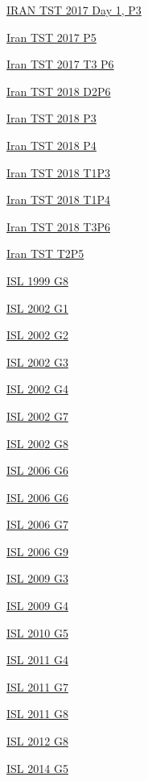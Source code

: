 \hyperref  [problem:IRAN TST 2017 Day 1, P3]{IRAN TST 2017 Day 1, P3}

\hyperref  [problem:Iran TST 2017 P5]{Iran TST 2017 P5}

\hyperref  [problem:Iran TST 2017 T3 P6]{Iran TST 2017 T3 P6}

\hyperref  [problem:Iran TST 2018 D2P6]{Iran TST 2018 D2P6}

\hyperref  [problem:Iran TST 2018 P3]{Iran TST 2018 P3}

\hyperref  [problem:Iran TST 2018 P4]{Iran TST 2018 P4}

\hyperref  [problem:Iran TST 2018 T1P3]{Iran TST 2018 T1P3}

\hyperref  [problem:Iran TST 2018 T1P4]{Iran TST 2018 T1P4}

\hyperref  [problem:Iran TST 2018 T3P6]{Iran TST 2018 T3P6}

\hyperref  [problem:Iran TST T2P5]{Iran TST T2P5}

\hyperref  [problem:ISL 1999 G8]{ISL 1999 G8}

\hyperref  [problem:ISL 2002 G1]{ISL 2002 G1}

\hyperref  [problem:ISL 2002 G2]{ISL 2002 G2}

\hyperref  [problem:ISL 2002 G3]{ISL 2002 G3}

\hyperref  [problem:ISL 2002 G4]{ISL 2002 G4}

\hyperref  [problem:ISL 2002 G7]{ISL 2002 G7}

\hyperref  [problem:ISL 2002 G8]{ISL 2002 G8}

\hyperref  [problem:ISL 2006 G6]{ISL 2006 G6}

\hyperref  [problem:ISL 2006 G6]{ISL 2006 G6}

\hyperref  [problem:ISL 2006 G7]{ISL 2006 G7}

\hyperref  [problem:ISL 2006 G9]{ISL 2006 G9}

\hyperref  [problem:ISL 2009 G3]{ISL 2009 G3}

\hyperref  [problem:ISL 2009 G4]{ISL 2009 G4}

\hyperref  [problem:ISL 2010 G5]{ISL 2010 G5}

\hyperref  [problem:ISL 2011 G4]{ISL 2011 G4}

\hyperref  [problem:ISL 2011 G7]{ISL 2011 G7}

\hyperref  [problem:ISL 2011 G8]{ISL 2011 G8}

\hyperref  [problem:ISL 2012 G8]{ISL 2012 G8}

\hyperref  [problem:ISL 2014 G5]{ISL 2014 G5}

